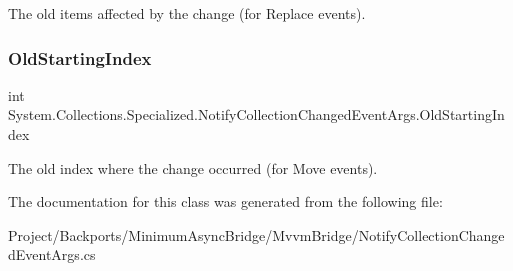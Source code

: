 The old items affected by the change (for Replace events). 

\mbox{\label{class_system_1_1_collections_1_1_specialized_1_1_notify_collection_changed_event_args_a02c502aab049e59093e5abab2aa587ad}} 
\subsubsection{\texorpdfstring{Old\+Starting\+Index}{OldStartingIndex}}
{\footnotesize\ttfamily int System.\+Collections.\+Specialized.\+Notify\+Collection\+Changed\+Event\+Args.\+Old\+Starting\+Index\hspace{0.3cm}{\ttfamily [get]}}



The old index where the change occurred (for Move events). 



The documentation for this class was generated from the following file\+:\begin{DoxyCompactItemize}
\item 
Project/\+Backports/\+Minimum\+Async\+Bridge/\+Mvvm\+Bridge/Notify\+Collection\+Changed\+Event\+Args.\+cs\end{DoxyCompactItemize}
